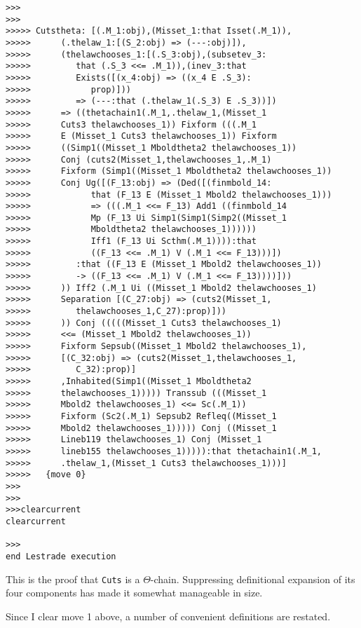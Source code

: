 \documentclass[12pt]{article}
\begin{document}
\begin{verbatim}
>>>
>>>
>>>>> Cutstheta: [(.M_1:obj),(Misset_1:that Isset(.M_1)),
>>>>>      (.thelaw_1:[(S_2:obj) => (---:obj)]),
>>>>>      (thelawchooses_1:[(.S_3:obj),(subsetev_3:
>>>>>         that (.S_3 <<= .M_1)),(inev_3:that
>>>>>         Exists([(x_4:obj) => ((x_4 E .S_3):
>>>>>            prop)]))
>>>>>         => (---:that (.thelaw_1(.S_3) E .S_3))])
>>>>>      => ((thetachain1(.M_1,.thelaw_1,(Misset_1
>>>>>      Cuts3 thelawchooses_1)) Fixform (((.M_1
>>>>>      E (Misset_1 Cuts3 thelawchooses_1)) Fixform
>>>>>      ((Simp1((Misset_1 Mboldtheta2 thelawchooses_1))
>>>>>      Conj (cuts2(Misset_1,thelawchooses_1,.M_1)
>>>>>      Fixform (Simp1((Misset_1 Mboldtheta2 thelawchooses_1))
>>>>>      Conj Ug([(F_13:obj) => (Ded([(finmbold_14:
>>>>>            that (F_13 E (Misset_1 Mbold2 thelawchooses_1)))
>>>>>            => (((.M_1 <<= F_13) Add1 ((finmbold_14
>>>>>            Mp (F_13 Ui Simp1(Simp1(Simp2((Misset_1
>>>>>            Mboldtheta2 thelawchooses_1))))))
>>>>>            Iff1 (F_13 Ui Scthm(.M_1)))):that
>>>>>            ((F_13 <<= .M_1) V (.M_1 <<= F_13)))])
>>>>>         :that ((F_13 E (Misset_1 Mbold2 thelawchooses_1))
>>>>>         -> ((F_13 <<= .M_1) V (.M_1 <<= F_13))))]))
>>>>>      )) Iff2 (.M_1 Ui ((Misset_1 Mbold2 thelawchooses_1)
>>>>>      Separation [(C_27:obj) => (cuts2(Misset_1,
>>>>>         thelawchooses_1,C_27):prop)]))
>>>>>      )) Conj (((((Misset_1 Cuts3 thelawchooses_1)
>>>>>      <<= (Misset_1 Mbold2 thelawchooses_1))
>>>>>      Fixform Sepsub((Misset_1 Mbold2 thelawchooses_1),
>>>>>      [(C_32:obj) => (cuts2(Misset_1,thelawchooses_1,
>>>>>         C_32):prop)]
>>>>>      ,Inhabited(Simp1((Misset_1 Mboldtheta2
>>>>>      thelawchooses_1))))) Transsub (((Misset_1
>>>>>      Mbold2 thelawchooses_1) <<= Sc(.M_1))
>>>>>      Fixform (Sc2(.M_1) Sepsub2 Refleq((Misset_1
>>>>>      Mbold2 thelawchooses_1))))) Conj ((Misset_1
>>>>>      Lineb119 thelawchooses_1) Conj (Misset_1
>>>>>      lineb155 thelawchooses_1))))):that thetachain1(.M_1,
>>>>>      .thelaw_1,(Misset_1 Cuts3 thelawchooses_1)))]
>>>>>   {move 0}
>>>
>>>
>>>clearcurrent
clearcurrent

>>>
end Lestrade execution
\end{verbatim}

This is the proof that {\tt Cuts} is a $\Theta$-chain.  Suppressing definitional expansion of its four components has made it somewhat manageable in size.

Since I clear move 1 above, a number of convenient definitions are restated.
\end{document}
